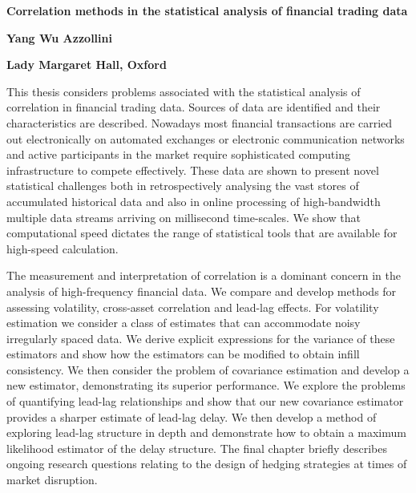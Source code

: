 \documentclass[12pt,a4paper,oneside,titlepage]{book}
\begin{document}
\begin{onehalfspace}
\thispagestyle{plain}
\begin{center}
\textbf{Correlation methods in the statistical analysis of financial trading data}

\textbf{Yang Wu Azzollini}

\textbf{Lady Margaret Hall, Oxford}
\end{center}
\vspace{1em}
This thesis considers problems associated with the statistical analysis of correlation in financial trading data. Sources of data are identified and their characteristics are described.  Nowadays most financial transactions are carried out electronically on automated exchanges or electronic communication networks and active participants in the market require sophisticated computing infrastructure to compete effectively. These data are shown to present novel statistical challenges both in retrospectively analysing the vast stores of accumulated historical data and also in online processing of high-bandwidth multiple data streams arriving on millisecond time-scales. We show that computational speed dictates the range of statistical tools that are available for high-speed calculation. 

The measurement and interpretation of correlation is a dominant concern in the analysis of high-frequency financial data. 
We compare and develop methods for assessing volatility, cross-asset correlation and lead-lag effects. For volatility estimation we consider a class of estimates that can accommodate noisy irregularly spaced data.  We derive explicit expressions for the variance of these estimators and show how the estimators can be modified to obtain infill consistency. We then consider the problem of covariance estimation and develop a new estimator, demonstrating its superior performance. We explore the problems of quantifying lead-lag relationships and show that our new covariance estimator provides a sharper estimate of lead-lag delay. We then develop a method of exploring lead-lag structure in depth and demonstrate how to obtain a maximum likelihood estimator of the delay structure. The final chapter briefly describes ongoing research questions relating to the design of hedging strategies at times of market disruption. 

\newpage
\thispagestyle{plain}
\begin{center}


\end{center}
\end{onehalfspace}
\end{document}
